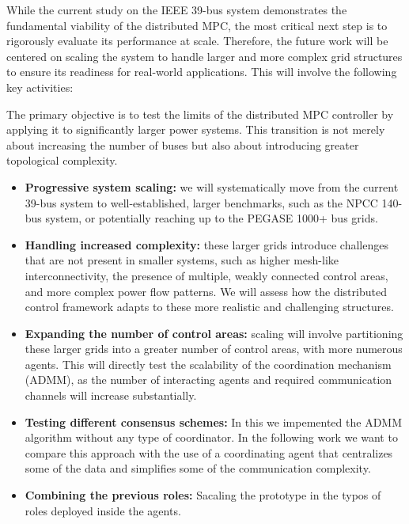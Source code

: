 \documentclass{article}
\begin{document}
While the current study on the IEEE 39-bus system demonstrates the fundamental viability of the distributed MPC, the most critical next step is to rigorously evaluate its performance at scale. Therefore, the future work will be centered on scaling the system to handle larger and more complex grid structures to ensure its readiness for real-world applications. This will involve the following key activities:

The primary objective is to test the limits of the distributed MPC controller by applying it to significantly larger power systems. This transition is not merely about increasing the number of buses but also about introducing greater topological complexity.
    
\begin{itemize}
    \item \textbf{Progressive system scaling:} we will systematically move from the current 39-bus system to well-established, larger benchmarks, such as the NPCC 140-bus system, or potentially reaching up to the PEGASE 1000+ bus grids. 

    \item \textbf{Handling increased complexity:} these larger grids introduce challenges that are not present in smaller systems, such as higher mesh-like interconnectivity, the presence of multiple, weakly connected control areas, and more complex power flow patterns. We will assess how the distributed control framework adapts to these more realistic and challenging structures.

    \item \textbf{Expanding the number of control areas:} scaling will involve partitioning these larger grids into a greater number of control areas, with more numerous agents. This will directly test the scalability of the coordination mechanism (ADMM), as the number of interacting agents and required communication channels will increase substantially.
    
    \item \textbf{Testing different consensus schemes:} In this we impemented the ADMM algorithm without any type of coordinator. In the following work we want to compare this approach with the use of a coordinating agent that centralizes some of the data and simplifies some of the communication complexity.
    
    \item \textbf{Combining the previous roles:} Sacaling the prototype in the typos of roles deployed inside the agents.
\end{itemize}
\end{document}
